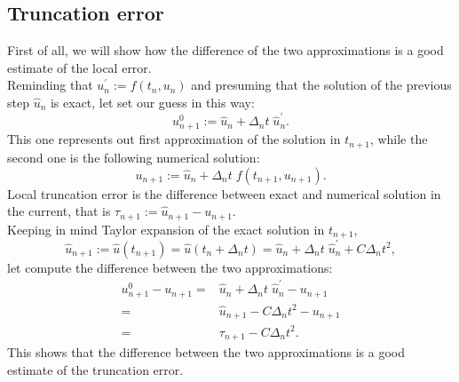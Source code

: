\subsection{Truncation error}
First of all, we will show how the difference of the two approximations is a good estimate of the local error. \\
Reminding that $ u_n^\prime := f(t_n, u_n) $ and presuming that the solution of the previous step $ \hat{u}_n $ is exact, let set our guess in this way:
\begin{equation}
\label{guess}
u_{n+1}^0 := \hat{u}_n + \Delta_n t \; \hat{u}^\prime_n.
\end{equation} 
This one represents out first approximation of the solution in $ t_{n+1} $, while the second one is the following numerical solution:
\begin{equation*}
u_{n+1} := \hat{u}_n + \Delta_n t \; f(t_{n+1} , u_{n+1}).
\end{equation*} 
Local truncation error is the difference between exact and numerical solution in the current, that is $ \tau_{n+1} := \hat{u}_{n+1} - u_{n+1} $.\\
Keeping in mind Taylor expansion of the exact solution in $ t_{n+1} $,
\begin{equation*}
\hat{u}_{n+1} := \hat{u}(t_{n+1}) = \hat{u}(t_{n} + \Delta_nt) = \hat{u}_n + \Delta_nt \; \hat{u}_n^\prime + C \Delta_nt^2,
\end{equation*}
let compute the difference between the two approximations:
\begin{eqnarray*}
u_{n+1}^0 - u_{n+1} = & \hat{u}_n + \Delta_n t\; \hat{u}^\prime_n -  u_{n+1} \\
 = & \hat{u}_{n+1} - C \Delta_nt^2 -  u_{n+1} \\
 = &  \tau_{n+1} - C \Delta_nt^2.
\end{eqnarray*}
This shows that the difference between the two approximations is a good estimate of the truncation error. 
